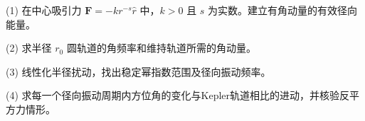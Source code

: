 (1) 在中心吸引力 \(\mathbf F=-kr^{-s}\hat r\) 中，\(k>0\) 且 \(s\) 为实数。建立有角动量的有效径向能量。

(2) 求半径 \(r_0\) 圆轨道的角频率和维持轨道所需的角动量。

(3) 线性化半径扰动，找出稳定幂指数范围及径向振动频率。

(4) 求每一个径向振动周期内方位角的变化与Kepler轨道相比的进动，并核验反平方力情形。
